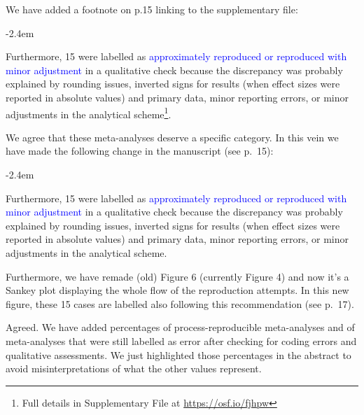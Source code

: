 \documentclass[draft]{article}
\renewenvironment{quote}{\begin{fquote}\advance\leftmargini -2.4em\begin{oldquote}}{\end{oldquote}\end{fquote}}
\newenvironment{fquote}
  {\def\FrameCommand{
	\fboxsep=0.6em %
	\fcolorbox{black}{white}}%
    \MakeFramed {\advance\hsize-2\width \FrameRestore}
    \begin{minipage}{\linewidth}
  }
  {\end{minipage}\endMakeFramed}
\begin{document}
We have added a footnote on p.15 linking to the supplementary file:

\begin{quote}
Furthermore, 15 were labelled as \textcolor{blue}{approximately reproduced or reproduced with minor adjustment} in a qualitative check because the discrepancy was probably explained by rounding issues, inverted signs for results (when effect sizes were reported in absolute values) and primary data, minor reporting errors, or minor adjustments in the analytical scheme\footnote{Full details in Supplementary File at \url{https://osf.io/fjhpw}}.
\end{quote}


We agree that these meta-analyses deserve a specific category. In this vein we have made the following change in the manuscript (see p.~15):

\begin{quote}
Furthermore, 15 were labelled as \textcolor{blue}{approximately reproduced or reproduced with minor adjustment} in a qualitative check because the discrepancy was probably explained by rounding issues, inverted signs for results (when effect sizes were reported in absolute values) and primary data, minor reporting errors, or minor adjustments in the analytical scheme.
\end{quote}

Furthermore, we have remade (old) Figure 6 (currently Figure 4) and now it's a Sankey plot displaying the whole flow of the reproduction attempts. In this new figure, these 15 cases are labelled also following this recommendation (see p.~17).


Agreed. We have added percentages of process-reproducible meta-analyses and of meta-analyses that were still labelled as error after checking for coding errors and qualitative assessments. We just highlighted those percentages in the abstract to avoid misinterpretations of what the other values represent.
\end{document}
